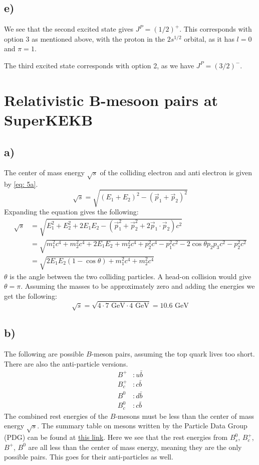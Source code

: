 \documentclass{article}
\begin{document}
\subsection*{e)}
We see that the second excited state gives $J^{P} = (1 / 2)^{+}$. This corresponds with option 3 as mentioned above, with the proton in the $2s^{1 / 2}$ orbital, as it has $l = 0$ and $π = 1$. 

The third excited state corresponds with option 2, as we have $J^{P} = (3 / 2)^{-}$. 


\section{Relativistic B-mesoon pairs at SuperKEKB}
\subsection*{a)}
The center of mass energy $\sqrt{s}$ of the colliding electron and anti electron is given by \cref{eq: 5a}.
\begin{equation}\label{eq: 5a}
\sqrt{s} = \sqrt{(E_1 + E_2)^2 - (\vec{p}_1 + \vec{p}_2)^2}
\end{equation}
Expanding the equation gives the following:
\begin{align}
\sqrt{s} &= \sqrt{E_1^2 + E_2^2 + 2E_1E_2 - (\vec{p}_1^2 + \vec{p}_2^2 + 2\vec{p}_1 \cdot \vec{p}_2)c^2} \\
&= \sqrt{m_1^2c^4 + m_2^2c^4 + 2E_1E_2 + m_2^2c^{4} + p_2^2c^{4} - p_1^2c^2 - 2 \cos θp_2p_3c^2 - p_2^2c^2} \\
&= \sqrt{2E_1E_2(1 - \cos θ) + m_1^2c^4 + m_2^2c^4}
\end{align}
$θ$ is the angle between the two colliding particles. A head-on collision would give $θ = π$. Assuming the masses to be approximately zero and adding the energies we get the following:
\begin{equation}
  \sqrt{s} = \sqrt{4 ⋅ 7 \text{ GeV} ⋅  4 \text{ GeV}} = 10.6 \text{ GeV}
\end{equation}

\subsection*{b)}
The following are possible $B$-meson pairs, assuming the top quark lives too short. There are also the anti-particle versions. 
\begin{align}
    B^{+} &: u \bar{b} \\
    B^{+}_c &: c \bar{b} \\
    B^{0} &: d \bar{b} \\
    B^{0}_c &: c \bar{b}
\end{align}
The combined rest energies of the $B$-mesons must be less than the center of mass energy $\sqrt{s}$. The summary table on mesons written by the Particle Data Group (PDG) can be found at \href{https://pdg.lbl.gov/2023/tables/contents_tables.html}{this link}. Here we see that the rest energies from $B^0_{s}$, $B_c^{+}$, $B^{+}$, $B^{0}$ are all less than the center of mass energy, meaning they are the only possible pairs. This goes for their anti-particles as well.
\end{document}
